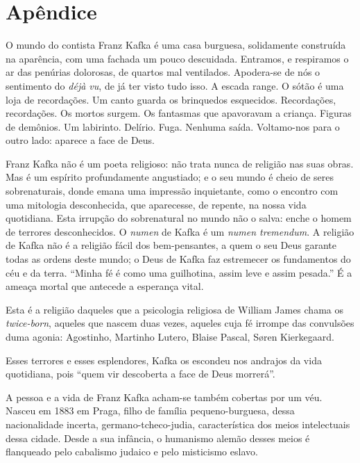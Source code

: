 \part{Apêndice}
\blankpage


\noindent{}O mundo do contista Franz Kafka é uma casa burguesa, solidamente construída na aparência, com uma fachada um pouco descuidada. Entramos, e respiramos o ar das penúrias dolorosas, de quartos mal ventilados. Apodera-se de nós o sentimento
do \textit{déjà vu}, de já ter visto tudo isso. A escada range. O sótão é uma
loja de recordações. Um canto guarda os brinquedos esquecidos. Recordações,
recordações. Os mortos surgem. Os fantasmas que apavoravam a criança.
Figuras de demônios. Um labirinto. Delírio. Fuga. Nenhuma saída.
Voltamo-nos para o outro lado: aparece a face de Deus.

Franz Kafka não é um poeta religioso: não trata nunca de religião nas suas obras.
Mas é um espírito profundamente angustiado; e o seu mundo é cheio de
seres sobrenaturais, donde emana uma impressão inquietante, como o
encontro com uma mitologia desconhecida, que aparecesse, de repente, na
nossa vida quotidiana. Esta irrupção do sobrenatural no mundo não o
salva: enche o homem de terrores desconhecidos. O \textit{numen} de Kafka é um \textit{numen tremendum}. A religião de Kafka não é a religião fácil dos bem-pensantes, a quem o seu Deus garante todas as
ordens deste mundo; o Deus de Kafka faz estremecer os fundamentos do céu
e da terra. ``Minha fé é como uma guilhotina, assim leve e assim
pesada.'' É a ameaça mortal que antecede a esperança vital.

Esta é a religião daqueles que a psicologia religiosa de William James chama os \textit{twice-born},
aqueles que nascem duas vezes, aqueles cuja fé irrompe das convulsões duma agonia: Agostinho, Martinho Lutero, Blaise Pascal, Søren Kierkegaard.

Esses terrores e esses esplendores, Kafka os escondeu nos andrajos da vida quotidiana, pois ``quem vir descoberta a face de Deus morrerá''.

A pessoa e a vida de Franz Kafka acham-se também cobertas por um véu.
Nasceu em 1883 em Praga, filho de família pequeno-burguesa, dessa
nacionalidade incerta, germano-tcheco-judia, característica dos meios
intelectuais dessa cidade. Desde a sua infância, o humanismo alemão
desses meios é flanqueado pelo cabalismo
judaico e pelo misticismo eslavo.

